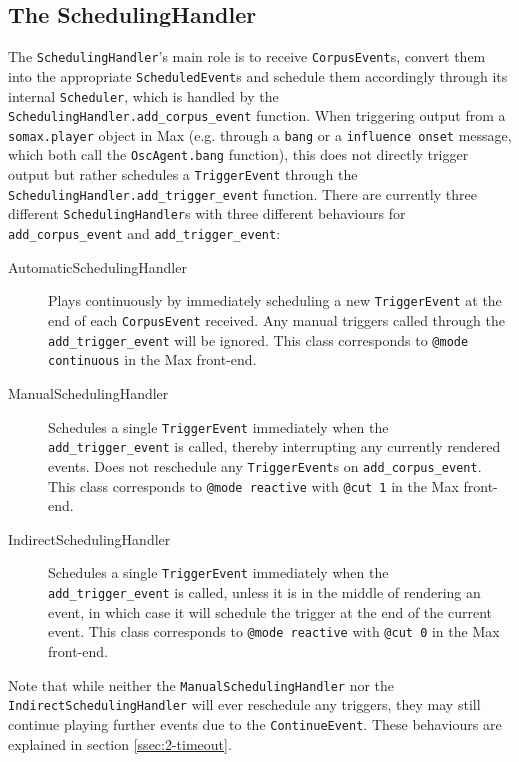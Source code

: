 \subsection{The SchedulingHandler}\label{ssec:2-scheduling-handler}
The \texttt{SchedulingHandler}'s main role is to receive \texttt{CorpusEvent}s, convert them into the appropriate \texttt{ScheduledEvent}s and schedule them accordingly through its internal \texttt{Scheduler}, which is handled by the \texttt{SchedulingHandler.add\_corpus\_event} function. When triggering output from a \texttt{somax.player} object in Max (e.g. through a \texttt{bang} or a \texttt{influence onset} message, which both call the \texttt{OscAgent.bang} function), this does not directly trigger output but rather schedules a \texttt{TriggerEvent} through the \texttt{SchedulingHandler.add\_trigger\_event} function. There are currently three different \texttt{SchedulingHandler}s with three different behaviours for \texttt{add\_corpus\_event} and \texttt{add\_trigger\_event}:

\begin{description}
	\item[AutomaticSchedulingHandler] Plays continuously by immediately scheduling a new \texttt{TriggerEvent} at the end of each \texttt{CorpusEvent} received. Any manual triggers called through the \texttt{add\_trigger\_event} will be ignored. This class corresponds to \texttt{@mode continuous} in the Max front-end.
	\item[ManualSchedulingHandler] Schedules a single \texttt{TriggerEvent} immediately when the \texttt{add\_trigger\_event} is called, thereby interrupting any currently rendered events. Does not reschedule any \texttt{TriggerEvent}s on \texttt{add\_corpus\_event}. This class corresponds to \texttt{@mode reactive} with \texttt{@cut 1} in the Max front-end.
	\item[IndirectSchedulingHandler] Schedules a single \texttt{TriggerEvent} immediately when the \texttt{add\_trigger\_event} is called, unless it is in the middle of rendering an event, in which case it will schedule the trigger at the end of the current event. This class corresponds to \texttt{@mode reactive} with \texttt{@cut 0} in the Max front-end.
\end{description}
Note that while neither the \texttt{ManualSchedulingHandler} nor the \\ \texttt{IndirectSchedulingHandler} will ever reschedule any triggers, they may still continue playing further events due to the \texttt{ContinueEvent}. These behaviours are explained in section \ref{ssec:2-timeout}.

